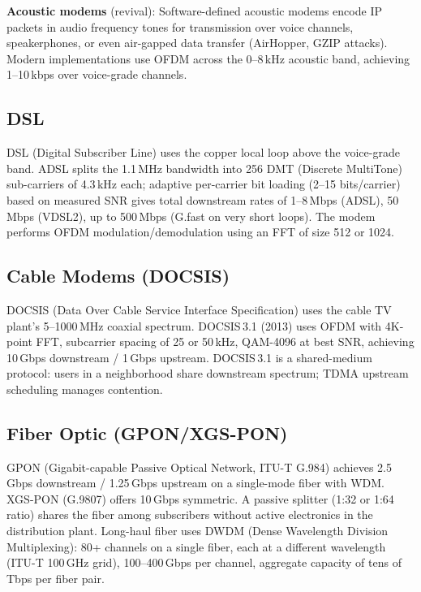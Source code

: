 \documentclass[11pt,letterpaper]{article}
\begin{document}
\textbf{Acoustic modems} (revival): Software-defined acoustic modems encode IP packets in audio frequency tones for transmission over voice channels, speakerphones, or even air-gapped data transfer (AirHopper, GZIP attacks). Modern implementations use OFDM across the 0--8\,kHz acoustic band, achieving 1--10\,kbps over voice-grade channels.

\subsection{DSL}

DSL (Digital Subscriber Line) uses the copper local loop above the voice-grade band. ADSL splits the 1.1\,MHz bandwidth into 256 DMT (Discrete MultiTone) sub-carriers of 4.3\,kHz each; adaptive per-carrier bit loading (2--15 bits/carrier) based on measured SNR gives total downstream rates of 1--8\,Mbps (ADSL), 50\,Mbps (VDSL2), up to 500\,Mbps (G.fast on very short loops). The modem performs OFDM modulation/demodulation using an FFT of size 512 or 1024.

\subsection{Cable Modems (DOCSIS)}

DOCSIS (Data Over Cable Service Interface Specification) uses the cable TV plant's 5--1000\,MHz coaxial spectrum. DOCSIS\,3.1 (2013) uses OFDM with 4K-point FFT, subcarrier spacing of 25 or 50\,kHz, QAM-4096 at best SNR, achieving 10\,Gbps downstream / 1\,Gbps upstream. DOCSIS\,3.1 is a shared-medium protocol: users in a neighborhood share downstream spectrum; TDMA upstream scheduling manages contention.

\subsection{Fiber Optic (GPON/XGS-PON)}

GPON (Gigabit-capable Passive Optical Network, ITU-T G.984) achieves 2.5\,Gbps downstream / 1.25\,Gbps upstream on a single-mode fiber with WDM. XGS-PON (G.9807) offers 10\,Gbps symmetric. A passive splitter (1:32 or 1:64 ratio) shares the fiber among subscribers without active electronics in the distribution plant. Long-haul fiber uses DWDM (Dense Wavelength Division Multiplexing): 80+ channels on a single fiber, each at a different wavelength (ITU-T 100\,GHz grid), 100--400\,Gbps per channel, aggregate capacity of tens of Tbps per fiber pair.
\end{document}
